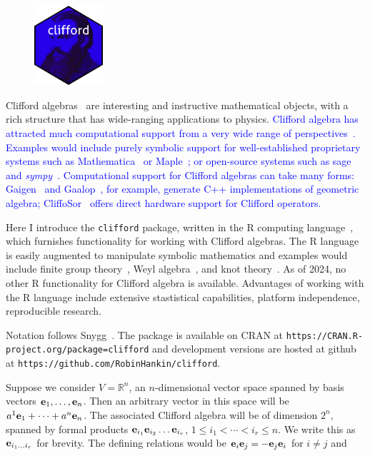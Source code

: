 \documentclass{birkjour}
\theoremstyle{definition}
\theoremstyle{remark}
\numberwithin{equation}{section}
\begin{document}
\setlength{\intextsep}{0pt}
\begin{figure}
  \begin{center}
\includegraphics[width=1in]{clifford.png}
  \end{center}
\end{figure}
Clifford algebras~\cite{hestenes1987} are interesting and instructive
mathematical objects, with a rich structure that has wide-ranging
applications to physics.  \textcolor{blue}{Clifford algebra has
  attracted much computational support from a very wide range of
  perspectives~\cite{burns2020}.  Examples would include purely
  symbolic support for well-established proprietary systems such as
  Mathematica~\cite{aragon2018} or Maple~\cite{ablamowicz2005}; or
  open-source systems such as sage~\cite{sagemath2019,scrimshaw2022}
  and \textit{sympy}~\cite{sympy2017}.  Computational support for
  Clifford algebras can take many forms: Gaigen~\cite{fontijne2006}
  and Gaalop~\cite{hildenbrand2010}, for example, generate C++
  implementations of geometric algebra; CliffoSor~\cite{franchini2008}
  offers direct hardware support for Clifford operators.  }


Here I introduce the {\tt clifford} package, written in the R
computing language~\cite{rcore2022}, which furnishes functionality for
working with Clifford algebras.  The R language is easily augmented to
manipulate symbolic mathematics and examples would include finite
group theory~\cite{hankin2020_permutations}, Weyl
algebra~\cite{hankin2022_weyl_arxiv}, and knot
theory~\cite{hankin2023}.  As of 2024, no other R functionality for
Clifford algebra is available.  Advantages of working with the R
language include extensive stastistical capabilities, platform
independence, reproducible research.

Notation follows Snygg~\cite{snygg2010}.  The
package is available on CRAN at
\verb+https://CRAN.R-project.org/package=clifford+ and development
versions are hosted at github at
\verb+https://github.com/RobinHankin/clifford+.


\newcommand{\ei}[1]{\ensuremath{{\bf e}_{#1}}}


Suppose we consider $V=\mathbb{R}^n$, an $n$-dimensional vector space
spanned by basis vectors $\ei{1},\ldots,\ei{n}$.  Then an arbitrary
vector in this space will be $a^1\ei{1}+\cdots+a^n\ei{n}$.  The
associated Clifford algebra will be of dimension $2^n$, spanned by
formal products $\ei{i_1}\ei{i_2}\ldots\ei{i_r}$, $1\leqslant
i_1<\cdots<i_r\leqslant n$.  We write this as $\ei{i_1\ldots i_r}$ for
brevity.  The defining relations would be $\ei{i}\ei{j}=-\ei{j}\ei{i}$
for $i\neq j$ and
\end{document}
